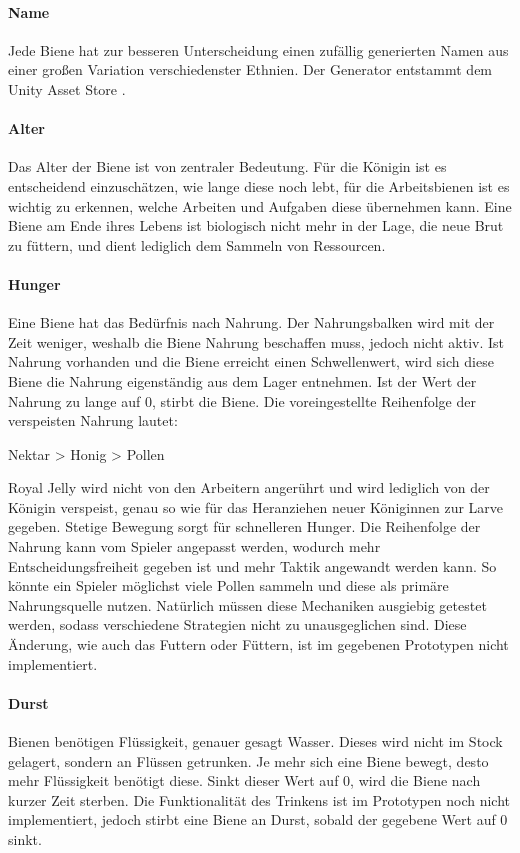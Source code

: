 \paragraph{Name}
Jede Biene hat zur besseren Unterscheidung einen zufällig generierten Namen aus einer großen Variation verschiedenster Ethnien. Der Generator entstammt dem Unity Asset Store \cite*[]{asset:namegenerator}.

\paragraph{Alter} 
Das Alter der Biene ist von zentraler Bedeutung. Für die Königin ist es entscheidend einzuschätzen, wie lange diese noch lebt, für die Arbeitsbienen ist es wichtig zu erkennen, welche Arbeiten und Aufgaben diese übernehmen kann. Eine Biene am Ende ihres Lebens ist biologisch nicht mehr in der Lage, die neue Brut zu füttern, und dient lediglich dem Sammeln von Ressourcen.

\paragraph{Hunger} 
Eine Biene hat das Bedürfnis nach Nahrung. Der Nahrungsbalken wird mit der Zeit weniger, weshalb die Biene Nahrung beschaffen muss, jedoch nicht aktiv. Ist Nahrung vorhanden und die Biene erreicht einen Schwellenwert, wird sich diese Biene die Nahrung eigenständig aus dem Lager entnehmen. Ist der Wert der Nahrung zu lange auf 0, stirbt die Biene. Die voreingestellte Reihenfolge der verspeisten Nahrung lautet:

\begin{center}
    Nektar > Honig > Pollen
\end{center} Royal Jelly wird nicht von den Arbeitern angerührt und wird lediglich von der Königin verspeist, genau so wie für das Heranziehen neuer Königinnen zur Larve gegeben. Stetige Bewegung sorgt für schnelleren Hunger. Die Reihenfolge der Nahrung kann vom Spieler angepasst werden, wodurch mehr Entscheidungsfreiheit gegeben ist und mehr Taktik angewandt werden kann. So könnte ein Spieler möglichst viele Pollen sammeln und diese als primäre Nahrungsquelle nutzen. Natürlich müssen diese Mechaniken ausgiebig getestet werden, sodass verschiedene Strategien nicht zu unausgeglichen sind. Diese Änderung, wie auch das Futtern oder Füttern, ist im gegebenen Prototypen nicht implementiert.

\paragraph{Durst} 
Bienen benötigen Flüssigkeit, genauer gesagt Wasser. Dieses wird nicht im Stock gelagert, sondern an Flüssen getrunken. Je mehr sich eine Biene bewegt, desto mehr Flüssigkeit benötigt diese. Sinkt dieser Wert auf 0, wird die Biene nach kurzer Zeit sterben. Die Funktionalität des Trinkens ist im Prototypen noch nicht implementiert, jedoch stirbt eine Biene an Durst, sobald der gegebene Wert auf 0 sinkt.

